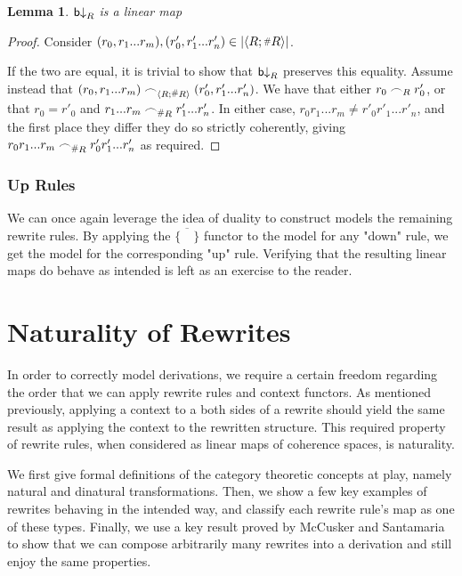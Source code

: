 \documentclass[11pt, oneside]{article}
\theoremstyle{plain}
\newtheorem{lemma}[theorem]{Lemma}
\theoremstyle{definition}
\newcommand{\hash}{\mathord{\raisebox{0.3ex}{\scalebox{0.7}{$\mathstrut \# $}}}}
\newcommand{\la}{\langle}
\newcommand{\ra}{\rangle}
\newcommand{\scoh}[1][]{\mathrel{\frown}_{\ifx\\#1\\\else#1\fi}}
\begin{document}
\begin{lemma}
    ${\mathsf b}{\downarrow}_{R}$ is a linear map
\end{lemma}

\begin{proof}
    Consider $(r_0,r_1...r_m),(r'_0,r'_1...r'_n)\in|\la R;\hash R\ra|$.

    If the two are equal, it is trivial to show that ${\mathsf b}{\downarrow}_{R}$ preserves this equality.
    Assume instead that $(r_0,r_1...r_m)\scoh[\la R;\hash R\ra](r'_0,r'_1...r'_n)$.
    We have that either $r_0\scoh[R]r'_0$, or that $r_0=r'_0$ and $r_1...r_m\scoh[\hash R]r'_1...r'_n$.
    In either case, $r_0r_1...r_m\neq r'_0r'_1...r'_n$, and the first place they differ they do so strictly coherently,
    giving $r_0r_1...r_m\scoh[\hash R]r'_0r'_1...r'_n$ as required.
\end{proof}

\subsubsection{Up Rules}
We can once again leverage the idea of duality to construct models the remaining rewrite rules.
By applying the $\overline{\{\quad\}}$ functor to the model for any "down" rule, we get the model for the corresponding "up" rule.
Verifying that the resulting linear maps do behave as intended is left as an exercise to the reader.

\newpage
\section{Naturality of Rewrites}
In order to correctly model derivations, we require a certain freedom regarding the order that we can apply rewrite rules and context functors.
As mentioned previously, applying a context to a both sides of a rewrite should yield the same result as applying the context to the rewritten structure.
This required property of rewrite rules, when considered as linear maps of coherence spaces, is naturality.

We first give formal definitions of the category theoretic concepts at play, namely natural and dinatural transformations. 
Then, we show a few key examples of rewrites behaving in the intended way, and classify each rewrite rule's map as one of these types.
Finally, we use a key result proved by McCusker and Santamaria to show that we can compose arbitrarily many rewrites into a derivation and still enjoy the same properties.
\end{document}
